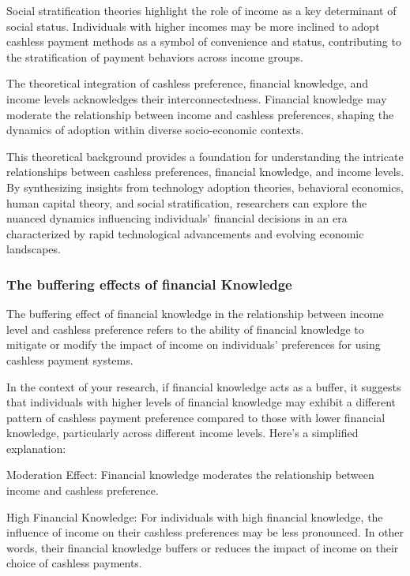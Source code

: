 \documentclass[
  super,
  preprint,
  3p]{elsarticle}
\begin{document}
Social stratification theories highlight the role of income as a key
determinant of social status. Individuals with higher incomes may be
more inclined to adopt cashless payment methods as a symbol of
convenience and status, contributing to the stratification of payment
behaviors across income groups.

The theoretical integration of cashless preference, financial knowledge,
and income levels acknowledges their interconnectedness. Financial
knowledge may moderate the relationship between income and cashless
preferences, shaping the dynamics of adoption within diverse
socio-economic contexts.

This theoretical background provides a foundation for understanding the
intricate relationships between cashless preferences, financial
knowledge, and income levels. By synthesizing insights from technology
adoption theories, behavioral economics, human capital theory, and
social stratification, researchers can explore the nuanced dynamics
influencing individuals' financial decisions in an era characterized by
rapid technological advancements and evolving economic landscapes.

\hypertarget{the-buffering-effects-of-financial-knowledge}{%
\subsubsection{The buffering effects of financial
Knowledge}\label{the-buffering-effects-of-financial-knowledge}}

The buffering effect of financial knowledge in the relationship between
income level and cashless preference refers to the ability of financial
knowledge to mitigate or modify the impact of income on individuals'
preferences for using cashless payment systems.

In the context of your research, if financial knowledge acts as a
buffer, it suggests that individuals with higher levels of financial
knowledge may exhibit a different pattern of cashless payment preference
compared to those with lower financial knowledge, particularly across
different income levels. Here's a simplified explanation:

Moderation Effect: Financial knowledge moderates the relationship
between income and cashless preference.

High Financial Knowledge: For individuals with high financial knowledge,
the influence of income on their cashless preferences may be less
pronounced. In other words, their financial knowledge buffers or reduces
the impact of income on their choice of cashless payments.
\end{document}
